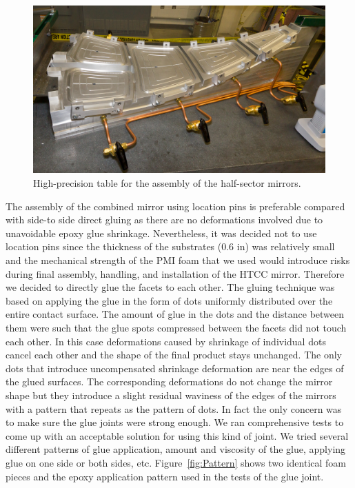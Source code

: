 \begin{figure}[ht]
    \centering
    \includegraphics[width=1.0\linewidth]{images/Half-sector_assem_tb2.JPG}
    \caption{High-precision table for the assembly of the half-sector mirrors.}
    \label{fig:Half-sector_assem_tb2}
\end{figure}

The assembly of the combined mirror using location pins is preferable compared with side-to side direct gluing
as there are no deformations involved due to unavoidable epoxy glue shrinkage. Nevertheless, it was decided
not to use location pins since the thickness of the substrates (0.6 in) was relatively small and the mechanical
strength of the PMI foam that we used would introduce risks during final assembly, handling, and installation of
the HTCC mirror. Therefore we decided to directly glue the facets to each other. The gluing technique was
based on applying the glue in the form of dots uniformly distributed over the entire contact surface. The
amount of glue in the dots and the distance between them were such that the glue spots compressed between
the facets did not touch each other. In this case deformations caused by shrinkage of individual dots cancel
each other and the shape of the final product stays unchanged. The only dots that introduce uncompensated
shrinkage deformation are near the edges of the glued surfaces. The corresponding deformations do not change
the mirror shape but they introduce a slight residual waviness of the edges of the mirrors with a pattern that
repeats as the pattern of dots. In fact the only concern was to make sure the glue joints were strong enough.
We ran comprehensive tests to come up with an acceptable solution for using this kind of joint. We tried several
different patterns of glue application, amount and viscosity of the glue, applying glue on one side or both sides,
etc. Figure~\ref{fig:Pattern} shows two identical foam pieces and the epoxy application pattern used in the
tests of the glue joint. 

